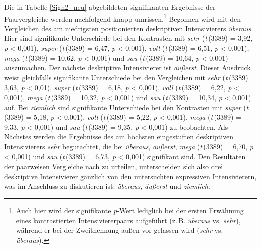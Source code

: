 Die in Tabelle \ref{Sign2_neu} abgebildeten signifikanten Ergebnisse der Paarvergleiche werden nachfolgend knapp umrissen.\footnote{Auch hier wird der signifikante \textit{p}-Wert lediglich bei der ersten Erwähnung eines kontrastierten Intensiviererpaars aufgeführt (z.\,B. \textit{überaus} vs. \textit{sehr}), während er bei der Zweitnennung außen vor gelassen wird (\textit{sehr} vs. \textit{überaus}).} Begonnen wird mit den Vergleichen des am niedrigsten positionierten deskriptiven Intensivierers \textit{überaus}. Hier sind signifikante Unterschiede bei den Kontrasten mit \textit{sehr} ({\textit{t}\,(3389) = 3,92}, \textit{p} < 0,001), \textit{super} (\textit{t}\,(3389) = 6,47, \textit{p} < 0,001), \textit{voll} (\textit{t}\,(3389) = 6,51, {\textit{p} < 0,001}), \textit{mega} (\textit{t}\,(3389) = 10,62, \textit{p} < 0,001) und  \textit{sau} ({\textit{t}\,(3389) = 10,64}, {\textit{p} < 0,001)} auszumachen. Der nächste deskriptive Intensivierer ist \textit{äußerst}. Dieser Ausdruck weist gleichfalls signifikante Unterschiede bei den Vergleichen mit \textit{sehr} (\textit{t}\,(3389) = 3,63, {\textit{p} < 0,01)}, \textit{super} (\textit{t}\,(3389) = 6,18, \textit{p} < 0,001), \textit{voll} ({\textit{t}\,(3389) = 6,22}, {\textit{p} < 0,001}), \textit{mega} {(\textit{t}\,(3389) = 10,32}, \textit{p} < 0,001) und \textit{sau} ({\textit{t}\,(3389) = 10,34}, {\textit{p} < 0,001)} auf. Bei \textit{ziemlich} sind signifikante Unterschiede bei den Kontrasten mit \textit{super} {(\textit{t}\,(3389) = 5,18,} \textit{p} < 0,001), \textit{voll} (\textit{t}\,(3389) = 5,22, {\textit{p} < 0,001}), \textit{mega} (\textit{t}\,(3389) = 9,33, {\textit{p} < 0,001}) und \textit{sau} {(\textit{t}\,(3389) = 9,35,} {\textit{p} < 0,001}) zu beobachten. Als Nächstes werden die Ergebnisse des am höchsten eingestuften deskriptiven Intensivierers \textit{sehr} begutachtet, die bei \textit{überaus}, \textit{äußerst}, \textit{mega} (\textit{t}\,(3389) = 6,70, {\textit{p} < 0,001)} und \textit{sau} ({\textit{t}\,(3389) = 6,73}, {\textit{p} < 0,001}) signifikant sind. Den Resultaten der paarweisen Vergleiche nach zu urteilen, unterscheiden sich also drei deskriptive Intensivierer gänzlich von den untersuchten expressiven Intensivierern, was im Anschluss zu diskutieren ist: \textit{überaus}, \textit{äußerst} {und \textit{ziemlich}}.


